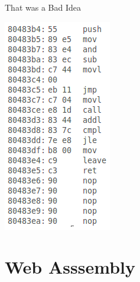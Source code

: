 \documentclass{lug}
\newcommand{\pmidg}[1]{\parbox{\widthof{#1}}{#1}}
\begin{document}
\begin{frame}{That was a Bad Idea}
{    }{\pmidg{
        \includegraphics[width=\columnwidth]{graphics/machine_code}
    }}
\end{frame}

\renewcommand{\secimage}{graphics/wasm_logo}
\section{Web Asssembly}
\end{document}
